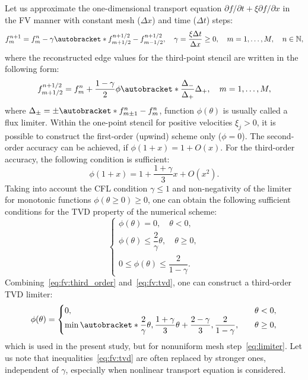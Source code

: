 \documentclass{elsarticle} %
\newcommand{\Pder}[2][]{\partial#1/\partial#2}
\newcommand{\OO}[1]{O(#1)}
\DeclarePairedDelimiter\autobracket()       %
\newcommand{\br}[1]{\autobracket*{#1}}
\begin{document}
Let us approximate the one-dimensional transport equation \(\Pder[f]{t} + \xi\Pder[f]{x}\)
in the FV manner with constant mesh (\(\Delta{x}\)) and time (\(\Delta{t}\)) steps:
\begin{equation}\label{eq:fv:scheme}
    f^{n+1}_m = f^n_m - \gamma\br{f^{n+1/2}_{m+1/2} - f^{n+1/2}_{m-1/2}}, \quad
    \gamma = \frac{\xi\Delta{t}}{\Delta{x}} \geq 0, \quad
    m = 1,\dots,M, \quad n\in\mathbb{N},
\end{equation}
where the reconstructed edge values for the third-point stencil are written in the following form:
\begin{equation}\label{eq:fv:flux}
    f^{n+1/2}_{m+1/2} = f^n_m + \frac{1-\gamma}2\phi\br{\frac{\Delta_-}{\Delta_+}}\Delta_+, \quad m = 1,\dots,M,
\end{equation}
where \(\Delta_\pm = \pm\br{f^n_{m\pm1} - f^n_m}\), function \(\phi(\theta)\) is usually called a flux limiter.
Within the one-point stencil for positive velocities \(\xi_j>0\),
it is possible to construct the first-order (upwind) scheme only (\(\phi=0\)).
The second-order accuracy can be achieved, if \(\phi(1+x) = 1 + \OO{x}\).
For the third-order accuracy, the following condition is sufficient:
\begin{equation}\label{eq:fv:third_order}
    \phi(1+x) = 1 + \frac{1+\gamma}3x + \OO{x^2}.
\end{equation}
Taking into account the CFL condition \(\gamma\leq1\)
and non-negativity of the limiter for monotonic functions \(\phi(\theta\geq0)\geq0\),
one can obtain the following sufficient conditions for the TVD property of the numerical scheme:
\begin{equation}\label{eq:fv:tvd}
    \begin{cases}
        \phi(\theta) = 0, \quad \theta < 0, \\
        \phi(\theta) \leq \dfrac{2}{\gamma}\theta, \quad \theta \geq 0, \\
        0 \leq \phi(\theta) \leq \dfrac2{1-\gamma}.
    \end{cases}
\end{equation}
Combining~\eqref{eq:fv:third_order} and~\eqref{eq:fv:tvd}, one can construct a third-order TVD limiter:
\begin{equation}\label{eq:fv:limiter}
    \phi(\theta) = \begin{cases}
        0, &\quad \theta < 0, \\
        \min\br{ \dfrac{2}{\gamma}\theta, \dfrac{1+\gamma}3\theta + \dfrac{2-\gamma}3, \dfrac2{1-\gamma}},
            &\quad \theta \geq 0,
    \end{cases}
\end{equation}
which is used in the present study, but for nonuniform mesh step~\eqref{eq:limiter}.
Let us note that inequalities~\eqref{eq:fv:tvd} are often replaced by stronger ones, independent of \(\gamma\),
especially when nonlinear transport equation is considered.
\end{document}
